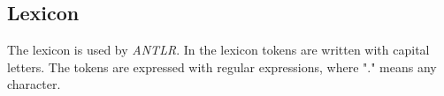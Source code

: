 \subsection{Lexicon}
The lexicon is used by \textit{ANTLR}. In the lexicon tokens are written with capital letters. The tokens are expressed with regular expressions, where "." means any character.
